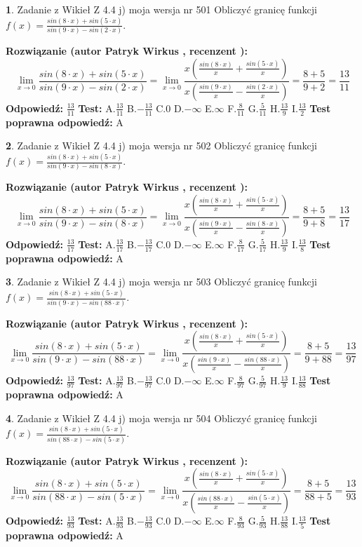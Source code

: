 \documentclass[12pt, a4paper]{article}
\theoremstyle{definition} %
\newtheorem{zad}{}
\newcommand{\zadStart}[1]{\begin{zad}#1\newline}
\newcommand{\zadStop}{\end{zad}}
\newcommand{\rozwStart}[2]{\noindent \textbf{Rozwiązanie (autor #1 , recenzent #2): }\newline}
\newcommand{\rozwStop}{\newline}
\newcommand{\odpStart}{\noindent \textbf{Odpowiedź:}\newline}
\newcommand{\odpStop}{\newline}
\newcommand{\testStart}{\noindent \textbf{Test:}\newline}
\newcommand{\testStop}{\newline}
\newcommand{\kluczStart}{\noindent \textbf{Test poprawna odpowiedź:}\newline}
\newcommand{\kluczStop}{\newline}
\begin{document}
\zadStart{Zadanie z Wikieł Z 4.4 j) moja wersja nr 501}
Obliczyć granicę funkcji $f(x)=\frac{sin(8\cdot x) +sin(5\cdot x)}{sin(9\cdot x) -sin(2\cdot x)}$.
\zadStop
\rozwStart{Patryk Wirkus}{}
$$\lim\limits_{x\to 0}\frac{sin(8\cdot x) +sin(5\cdot x)}{sin(9\cdot x) -sin(2\cdot x)}=\lim\limits_{x\to 0}\frac{x(\frac{sin(8\cdot x)}{x}+\frac{sin(5\cdot x)}{x})}{x(\frac{sin(9\cdot x)}{x}-\frac{sin(2\cdot x)}{x})}=\frac{8+5}{9+2} = \frac{13}{11}$$
\rozwStop
\odpStart
$\frac{13}{11}$
\odpStop
\testStart
A.$\frac{13}{11}$
B.$-\frac{13}{11}$
C.$0$
D.$-\infty$
E.$\infty$
F.$\frac{8}{11}$
G.$\frac{5}{11}$
H.$\frac{13}{9}$
I.$\frac{13}{2}$
\testStop
\kluczStart
A
\kluczStop



\zadStart{Zadanie z Wikieł Z 4.4 j) moja wersja nr 502}
Obliczyć granicę funkcji $f(x)=\frac{sin(8\cdot x) +sin(5\cdot x)}{sin(9\cdot x) -sin(8\cdot x)}$.
\zadStop
\rozwStart{Patryk Wirkus}{}
$$\lim\limits_{x\to 0}\frac{sin(8\cdot x) +sin(5\cdot x)}{sin(9\cdot x) -sin(8\cdot x)}=\lim\limits_{x\to 0}\frac{x(\frac{sin(8\cdot x)}{x}+\frac{sin(5\cdot x)}{x})}{x(\frac{sin(9\cdot x)}{x}-\frac{sin(8\cdot x)}{x})}=\frac{8+5}{9+8} = \frac{13}{17}$$
\rozwStop
\odpStart
$\frac{13}{17}$
\odpStop
\testStart
A.$\frac{13}{17}$
B.$-\frac{13}{17}$
C.$0$
D.$-\infty$
E.$\infty$
F.$\frac{8}{17}$
G.$\frac{5}{17}$
H.$\frac{13}{9}$
I.$\frac{13}{8}$
\testStop
\kluczStart
A
\kluczStop



\zadStart{Zadanie z Wikieł Z 4.4 j) moja wersja nr 503}
Obliczyć granicę funkcji $f(x)=\frac{sin(8\cdot x) +sin(5\cdot x)}{sin(9\cdot x) -sin(88\cdot x)}$.
\zadStop
\rozwStart{Patryk Wirkus}{}
$$\lim\limits_{x\to 0}\frac{sin(8\cdot x) +sin(5\cdot x)}{sin(9\cdot x) -sin(88\cdot x)}=\lim\limits_{x\to 0}\frac{x(\frac{sin(8\cdot x)}{x}+\frac{sin(5\cdot x)}{x})}{x(\frac{sin(9\cdot x)}{x}-\frac{sin(88\cdot x)}{x})}=\frac{8+5}{9+88} = \frac{13}{97}$$
\rozwStop
\odpStart
$\frac{13}{97}$
\odpStop
\testStart
A.$\frac{13}{97}$
B.$-\frac{13}{97}$
C.$0$
D.$-\infty$
E.$\infty$
F.$\frac{8}{97}$
G.$\frac{5}{97}$
H.$\frac{13}{9}$
I.$\frac{13}{88}$
\testStop
\kluczStart
A
\kluczStop



\zadStart{Zadanie z Wikieł Z 4.4 j) moja wersja nr 504}
Obliczyć granicę funkcji $f(x)=\frac{sin(8\cdot x) +sin(5\cdot x)}{sin(88\cdot x) -sin(5\cdot x)}$.
\zadStop
\rozwStart{Patryk Wirkus}{}
$$\lim\limits_{x\to 0}\frac{sin(8\cdot x) +sin(5\cdot x)}{sin(88\cdot x) -sin(5\cdot x)}=\lim\limits_{x\to 0}\frac{x(\frac{sin(8\cdot x)}{x}+\frac{sin(5\cdot x)}{x})}{x(\frac{sin(88\cdot x)}{x}-\frac{sin(5\cdot x)}{x})}=\frac{8+5}{88+5} = \frac{13}{93}$$
\rozwStop
\odpStart
$\frac{13}{93}$
\odpStop
\testStart
A.$\frac{13}{93}$
B.$-\frac{13}{93}$
C.$0$
D.$-\infty$
E.$\infty$
F.$\frac{8}{93}$
G.$\frac{5}{93}$
H.$\frac{13}{88}$
I.$\frac{13}{5}$
\testStop
\kluczStart
A
\kluczStop
\end{document}
